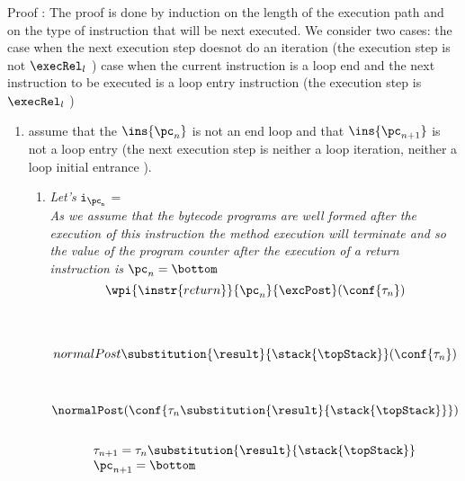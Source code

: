 	Proof :
The proof is done by induction on the length of the execution path and on the type of instruction that will be next executed. 
We consider two cases: the case when the next execution step doesnot do an iteration (the execution step is not  $\execRel_l$ ) 
case when the current instruction is a loop end and the next instruction to be executed is a loop entry instruction (the execution step is $\execRel_l$ ) 
  
\begin{enumerate}
  \item assume that the  $\ins{{\pc_{n}}}$ is not an end loop and that $\ins{{\pc_{n + 1}}}$ is not a loop entry 
  (the next execution step is neither a loop iteration, neither a loop initial entrance ).  
   \begin{enumerate} 
		\item   \textit{Let's} $\tt{i_{\pc_n}}$ = \\
		    	\textit{ As we assume that the bytecode programs are well formed after the execution of this instruction
 			the method execution will terminate and so the value of the program counter after the execution of a return
			instruction is} $\pc_n = \bottom$ \\
			$$\wpi{ \instr{return}}{\pc_n}{\excPost}(\conf{\state{n}}) $$\\
			\\
			 
                        $$ normalPost \substitution{ \result }{\stack{\topStack} } (\conf{\state{n}}) $$\\
			\\
			$ \normalPost (\conf{\state{n}\substitution{\result}{\stack{\topStack}} } )  $\\
			
			  \\
		
	 	$$ 
		\begin{array}{l}
		   \state{n + 1} = \state{n}\substitution{\result}{ \stack{\topStack}} \\
		   \pc_{n+1} = \bottom 
		\end{array} $$\\


\end{enumerate}
\end{enumerate}
